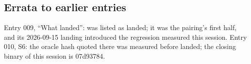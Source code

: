 \subsection*{Errata to earlier entries}
Entry 009, ``What landed'':  was listed as landed; it was the pairing's first half, and its
2026-09-15 landing introduced the  regression measured this session. Entry 010, S6: the
oracle hash quoted there was measured before  landed; the closing binary of this session is
07d93784.
